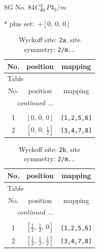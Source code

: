 \documentclass[fleqn,8pt]{jsarticle}
\begin{document}
\setcounter{MaxMatrixCols}{32}

\renewcommand{\tablename}{Table~}
\renewcommand{\figurename}{Figure~}
\begin{center}
\LARGE
SG No. 84\quad$C_{\rm 4h}^{2}$\quad$P4_2/m$\quad[ tetragonal ]
\end{center}
* plus set:\,\,\,$+\left[ 0,\, 0,\, 0 \right]$
\renewcommand{\arraystretch}{1.2}
\begin{longtable}{ccc}
\caption{Wyckoff site: {\tt 2a}, site symmetry: {\tt 2/m..}}
 \\
 \hline \hline
No. & position & mapping \\ \hline \endfirsthead

\multicolumn{2}{l}{\tablename\ \thetable{}} \\
 \hline \hline
No. & position & mapping \\ \hline \endhead

 \hline \hline
\multicolumn{2}{r}{\footnotesize\it continued ...} \\ \endfoot

 \hline \hline
\multicolumn{2}{r}{} \\ \endlastfoot

1 & $\left[ 0,\, 0,\, 0 \right]$ & {\tt [1,2,5,6]} \\ \hline
2 & $\left[ 0,\, 0,\, \frac{1}{2} \right]$ & {\tt [3,4,7,8]} \\
\end{longtable}
\renewcommand{\arraystretch}{1.2}
\begin{longtable}{ccc}
\caption{Wyckoff site: {\tt 2b}, site symmetry: {\tt 2/m..}}
 \\
 \hline \hline
No. & position & mapping \\ \hline \endfirsthead

\multicolumn{2}{l}{\tablename\ \thetable{}} \\
 \hline \hline
No. & position & mapping \\ \hline \endhead

 \hline \hline
\multicolumn{2}{r}{\footnotesize\it continued ...} \\ \endfoot

 \hline \hline
\multicolumn{2}{r}{} \\ \endlastfoot

1 & $\left[ \frac{1}{2},\, \frac{1}{2},\, 0 \right]$ & {\tt [1,2,5,6]} \\ \hline
2 & $\left[ \frac{1}{2},\, \frac{1}{2},\, \frac{1}{2} \right]$ & {\tt [3,4,7,8]} \\
\end{longtable}
\end{document}
